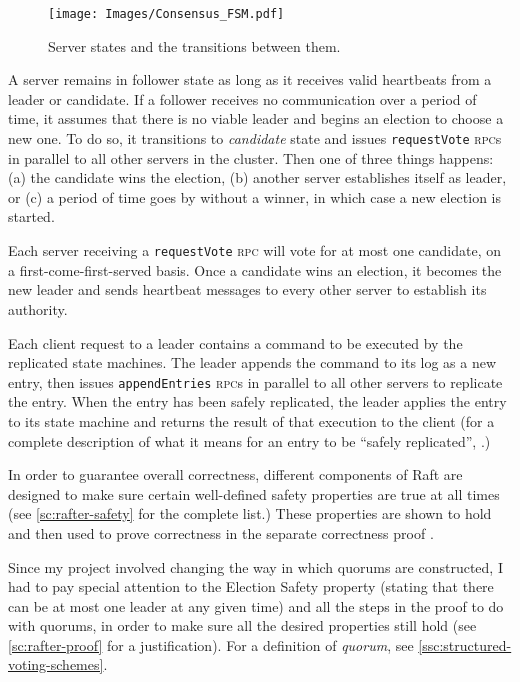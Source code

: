\documentclass[12pt,chapterprefix=true,toc=bibliography,numbers=noendperiod,
               footnotes=multiple,twoside]{scrreprt}
\newcommand{\requestVoteRPC}[0]{\texttt{requestVote} \textsc{rpc}}
\newcommand{\appendEntriesRPC}[0]{\texttt{appendEntries} \textsc{rpc}}
\begin{document}
\begin{figure}[h]
    \centering
    \texttt{[image: Images/Consensus\_FSM.pdf]}
    \caption{Server states and the transitions between them.
        \protect{}
    }
    \label{fig:consensus-fsm}
\end{figure}


A server remains in follower state as long as it receives valid heartbeats from a leader or candidate. If a follower receives no communication over a period of time, it assumes that there is no viable leader and begins an election to choose a new one. To do so, it transitions to \textit{candidate} state and issues \requestVoteRPC s in parallel to all other servers in the cluster. Then one of three things happens: (a) the candidate wins the election, (b) another server establishes itself as leader, or (c) a period of time goes by without a winner, in which case a new election is started.

Each server receiving a \requestVoteRPC{} will vote for at most one candidate, on a first-come-first-served basis. Once a candidate wins an election, it becomes the new leader and sends heartbeat messages to every other server to establish its authority.


Each client request to a leader contains a command to be executed by the replicated state machines. The leader appends the command to its log as a new entry, then issues \appendEntriesRPC s in parallel to all other servers to replicate the entry. When the entry has been safely replicated, the leader applies the entry to its state machine and returns the result of that execution to the client (for a complete description of what it means for an entry to be \enquote{safely replicated}, \cite[see][subsection 5.3]{raft}.)


In order to guarantee overall correctness, different components of Raft are designed to make sure certain well-defined safety properties are true at all times (see \cref{sc:rafter-safety} for the complete list.) These properties are shown to hold and then used to prove correctness in the separate correctness proof \autocite{raftproof}.

Since my project involved changing the way in which quorums are constructed, I had to pay special attention to the Election Safety property (stating that there can be at most one leader at any given time) and all the steps in the proof to do with quorums, in order to make sure all the desired properties still hold (see \cref{sc:rafter-proof} for a justification). For a definition of \emph{quorum}, see \cref{ssc:structured-voting-schemes}.
\end{document}
